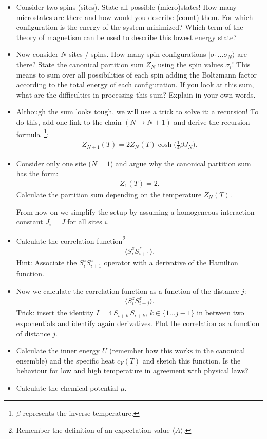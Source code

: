 \documentclass[12pt,a4paper]{article} %
\begin{document}
\begin{itemize}
 \item Consider two spins (sites). State all possible (micro)states! How many microstates are there and how would you describe (count) them. For which configuration is the energy of the system minimized?
 Which term of the theory of magnetism can be used to describe this lowest energy state?
 \item Now consider $N$ sites / spins. How many spin configurations $|\sigma_1 \dots \sigma_N\rangle$ are there? State the canonical partition sum $Z_N$ using the spin values $\sigma_i$! This means to sum over all possibilities of each spin adding the Boltzmann factor according to the total energy of each configuration.
 If you look at this sum, what are the difficulties in processing this sum? Explain in your own words.
 
 \item Although the sum looks tough, we will use a trick to solve it: a recursion!
 To do this, add one link to the chain $(N \rightarrow N+1)$ and derive the recursion formula~\footnote{$\beta$ represents the inverse temperature.}:
 \begin{align*}
  Z_{N+1} (T) = 2Z_N (T) \cosh\big(\frac{1}{4} \beta J_N\big) .
 \end{align*}

 \item Consider only one site ($N=1$) and argue why the canonical partition sum has the form:
 \begin{align*}
  Z_1(T) = 2.
 \end{align*}
 Calculate the partition sum depending on the temperature $Z_N(T)$. 
 
 From now on we simplify the setup by assuming a homogeneous interaction constant $J_i = J$ for all sites $i$.
 \item Calculate the correlation function\footnote{Remember the definition of an expectation value $\langle A \rangle$.}
 \begin{align*}
  \langle S_i^z S_{i+1}^z \rangle.
 \end{align*}
 Hint: Associate the $S_i^z S_{i+1}^z$ operator with a derivative of the Hamilton function.
 \item Now we calculate the correlation function as a function of the distance $j$:
 \begin{align*}
  \langle S_i^z S_{i+j}^z \rangle.
 \end{align*}
 Trick: insert the identity $ I = 4 \,S_{i+k}\, S_{i+k}$, $k\in\{1\dots j-1\}$ in between two exponentials and identify again derivatives. Plot the correlation as a function of distance $j$.

 
 \item Calculate the inner energy $U$ (remember how this works in the canonical ensemble) and the specific heat $c_V(T)$ and sketch this function. 
 Is the behaviour for low and high temperature in agreement with physical laws?
 \item Calculate the chemical potential $\mu$.
\end{itemize}
\end{document}
